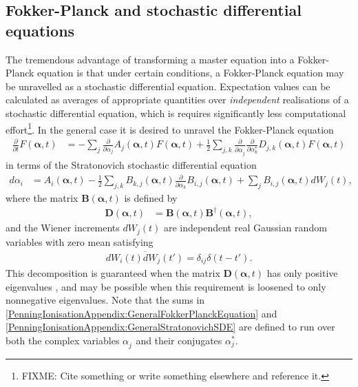\subsection{Fokker-Planck and stochastic differential equations}
The tremendous advantage of transforming a master equation into a Fokker-Planck equation is that under certain conditions, a Fokker-Planck equation may be unravelled as a stochastic differential equation. Expectation values can be calculated as averages of appropriate quantities over \emph{independent} realisations of a stochastic differential equation, which is requires significantly less computational effort\footnote{FIXME: Cite something or write something elsewhere and reference it.}. In the general case it is desired to unravel the Fokker-Planck equation
\begin{align}
    \frac{\partial}{\partial t}F(\bm{\alpha}, t) &= - \sum_j \frac{\partial}{\partial \alpha_j} A_j(\bm{\alpha}, t) F(\bm{\alpha}, t) + \frac{1}{2} \sum_{j, k} \frac{\partial}{\partial \alpha_j^{\phantom{*}}} \frac{\partial}{\partial \alpha_k^*} D_{j,k}(\bm{\alpha}, t) F(\bm{\alpha}, t) \label{PenningIonisationAppendix:GeneralFokkerPlanckEquation}
\end{align}
in terms of the Stratonovich stochastic differential equation
\begin{align}
    d \alpha_i &= A_i(\bm{\alpha}, t) - \frac{1}{2} \sum_{j, k} B_{k, j}(\bm{\alpha}, t) \frac{\partial }{\partial \alpha_k}B_{i,j}(\bm{\alpha}, t) + \sum_j B_{i,j}(\bm{\alpha}, t) d W_j(t), \label{PenningIonisationAppendix:GeneralStratonovichSDE}
\end{align}
where the matrix $\bm{B}(\bm{\alpha}, t)$ is defined by
\begin{align}
    \bm{D}(\bm{\alpha}, t) &= \bm{B}(\bm{\alpha}, t) \bm{B}^\dagger(\bm{\alpha}, t),
\end{align}
and the Wiener increments $d W_j(t)$ are independent real Gaussian random variables with zero mean satisfying
\begin{align}
    \overline{d W_i(t) dW_j(t')} = \delta_{i j}\delta(t - t').
\end{align}
This decomposition is guaranteed when the matrix $\bm{D}(\bm{\alpha}, t)$ has only positive eigenvalues \citep{GardinerHSM}, and may be possible when this requirement is loosened to only nonnegative eigenvalues. Note that the sums in \eqref{PenningIonisationAppendix:GeneralFokkerPlanckEquation} and \eqref{PenningIonisationAppendix:GeneralStratonovichSDE} are defined to run over both the complex variables $\alpha_j^{\phantom{*}}$ and their conjugates $\alpha_j^*$.

